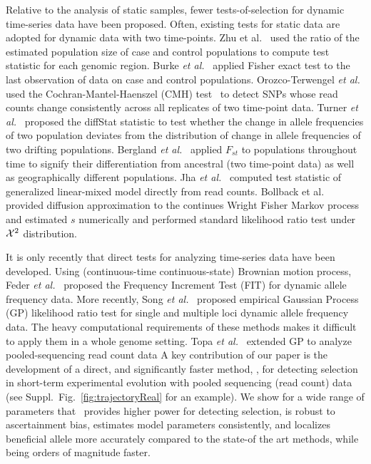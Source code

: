 Relative to the analysis of static samples, fewer tests-of-selection
for dynamic time-series data have been proposed. Often, existing tests
for static data are adopted for dynamic data with two time-points. Zhu
et al.~\cite{zhou2011experimental} used the ratio of the estimated
population size of case and control populations to compute test
statistic for each genomic region. Burke \emph{et
  al.}~\cite{burke2010genome} applied Fisher exact test to the last
observation of data on case and control populations.  Orozco-Terwengel
\emph{et al.}~\cite{orozco2012adaptation} used the
Cochran-Mantel-Haenszel (CMH) test~\cite{agresti2011categorical} to
detect SNPs whose read counts change consistently across all
replicates of two time-point data.  Turner \emph{et
  al.}~\cite{turner2011population} proposed the diffStat statistic to
test whether the change in allele frequencies of two population
deviates from the distribution of change in allele frequencies of two
drifting populations.  Bergland \emph{et
  al.}~\cite{bergland2014genomic} applied $F_{st}$ to populations
throughout time to signify their differentiation from ancestral (two
time-point data) as well as geographically different populations. Jha
\emph{et al.}~\cite{jha2015whole} computed test statistic of
generalized linear-mixed model directly from read counts.  Bollback et
al.~\cite{bollback2008estimation} provided diffusion approximation to
the continues Wright Fisher Markov process and estimated $s$
numerically and performed standard likelihood ratio test under ${\cal X}^2$
distribution.

It is only recently that direct tests for analyzing time-series data
have been developed. Using (continuous-time continuous-state) Brownian
motion process, Feder \emph{et al.}~\cite{feder2014Identifying}
proposed the Frequency Increment Test (FIT) for dynamic allele
frequency data. More recently, Song \emph{et
  al.}~\cite{Terhorst2015Multi} proposed empirical Gaussian Process
(GP) likelihood ratio test for single and multiple loci dynamic allele
frequency data. The heavy computational requirements of these methods
makes it difficult to apply them in a whole genome setting.  Topa
\emph{et al.}~\cite{topa2015gaussian} extended GP to analyze
pooled-sequencing read count data A key contribution of our paper is
the development of a direct, and significantly faster method, \comale,
for detecting selection in short-term experimental evolution with
pooled sequencing (read count) data (see
Suppl.~Fig.~\ref{fig:trajectoryReal} for an example).  We show for a
wide range of parameters that \comale\ provides higher power for
detecting selection, is robust to ascertainment bias, estimates model
parameters consistently, and localizes beneficial allele more
accurately compared to the state-of the art methods, while being
orders of magnitude faster.
